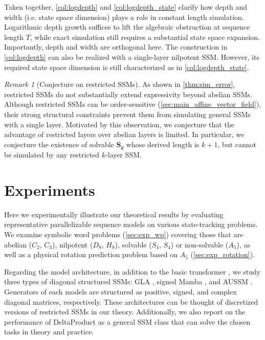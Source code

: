 \documentclass{article}
\theoremstyle{plain}
\theoremstyle{definition}
\theoremstyle{remark}
\newtheorem{remark}[theorem]{Remark}
\newcommand{\fr}[1]{\mathfrak{#1}}
\newcommand{\mbf}[1]{\mathbf{#1}}
\begin{document}
Taken together, \cref{col:logdepth} and \cref{col:logdepth_state} clarify how depth and width (i.e. state space dimension) plays a role in constant length simulation. Logarithmic depth growth suffices to lift the algebraic obstruction at sequence length $T$, while exact simulation still requires a substantial state space expansion.
Importantly, depth and width are orthogonal here.
The construction in \cref{col:logdepth}
can also be realized with a single-layer nilpotent SSM.
However, its required state space dimension is still characterized as in \cref{col:logdepth_state}.

\begin{remark}[Conjecture on restricted SSMs]
\label{rem:conjecture_restricted_limits}
    As shown in \cref{thm:sim_error}, restricted SSMs do not substantially extend expressivity beyond abelian SSMs. Although restricted SSMs can be order-sensitive (\cref{sec:main_affine_vector_field}), their strong structural constraints prevent them from simulating general SSMs with a single layer.
    Motivated by this observation, we conjecture that the advantage of restricted layers over abelian layers is limited. In particular, we conjecture the existence of solvable $\mbf{S}_\fr{g}$ whose derived length is $k+1$, but cannot be simulated by any restricted $k$-layer SSM.
\end{remark}

\section{Experiments}
\label{sec:exp}
Here we experimentally illustrate our theoretical results by evaluating representative parallelizable sequence models on various state-tracking problems.  We examine symbolic word problems (\cref{sec:exp_wp}) covering those that are abelian ($C_2$, $C_3$), nilpotent ($D_8$, $H_8$), solvable ($S_3$, $S_4$) or non-solvable ($A_5$), as well as a physical rotation prediction problem based on $A_5$ (\cref{sec:exp_rotation}).

Regarding the model architecture, in addition to the basic transformer \citep{trafo}, we study three types of diagonal structured SSMs: GLA \citep{YangWSPK24}, signed Mamba \citep{grazzi2024unlocking}, and AUSSM \citep{karuvally2025bridging}.
Generators of each models are structured as positive, signed, and complex diagonal matrices, respectively.
These architectures can be thought of discretized versions of restricted SSMs in our theory.
Additionally, we also report on the performance of DeltaProduct \citep{siems2025deltaproduct} as a general SSM class
that can solve the chosen tasks in theory and practice.
\end{document}
